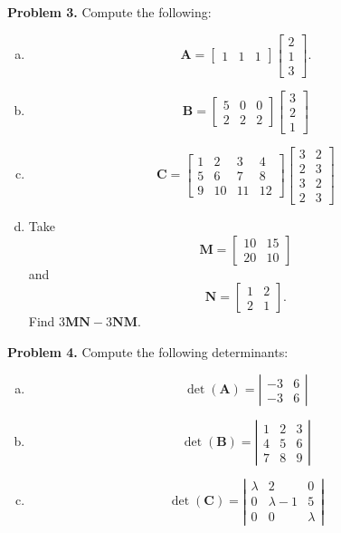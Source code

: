 \documentclass[12pt]{report} %
\theoremstyle{definition}
\begin{document}
\noindent\textbf{Problem 3.} Compute the following:
\begin{enumerate}[(a)]
    \item 
    \[
    \mathbf{A}=\begin{bmatrix} 1& 1& 1 \end{bmatrix}
    \begin{bmatrix} 2\\ 1\\ 3 \end{bmatrix}.
    \]
    \item 
    \[
    \mathbf{B}=\begin{bmatrix} 5& 0& 0\\ 2& 2& 2\end{bmatrix}
    \begin{bmatrix} 3\\ 2\\ 1 \end{bmatrix}
    \]
    \item
    \[
    \mathbf{C}=\begin{bmatrix} 1& 2& 3& 4\\ 5& 6& 7& 8\\ 9& 10& 11& 12\end{bmatrix}
    \begin{bmatrix} 3& 2\\ 2& 3\\ 3& 2\\ 2& 3\end{bmatrix}
    \]
    \item Take
    \[
    \mathbf{M}=\begin{bmatrix} 10& 15\\ 20& 10 \end{bmatrix}
    \]
    and
    \[
    \mathbf{N}=\begin{bmatrix} 1 & 2\\ 2& 1\end{bmatrix}.
    \]
    Find $3\mathbf{MN}-3\mathbf{NM}$.
\end{enumerate}

\noindent\textbf{Problem 4.} Compute the following determinants:
\begin{enumerate}[(a)]
    \item
    \[
    \det(\mathbf{A})=\left| \begin{array}{cc}
    -3& 6\\
    -3& 6
    \end{array}\right|
    \]
    \item 
    \[
    \det(\mathbf{B})=\left| \begin{array}{ccc}
    1& 2& 3\\
    4& 5& 6\\
    7& 8& 9
    \end{array}\right|
    \]
    \item    
    \[
    \det(\mathbf{C})=\left| \begin{array}{ccc}
    \lambda& 2& 0\\
    0& \lambda -1& 5\\
    0& 0& \lambda
    \end{array}\right|
    \]
\end{enumerate}
\end{document}
